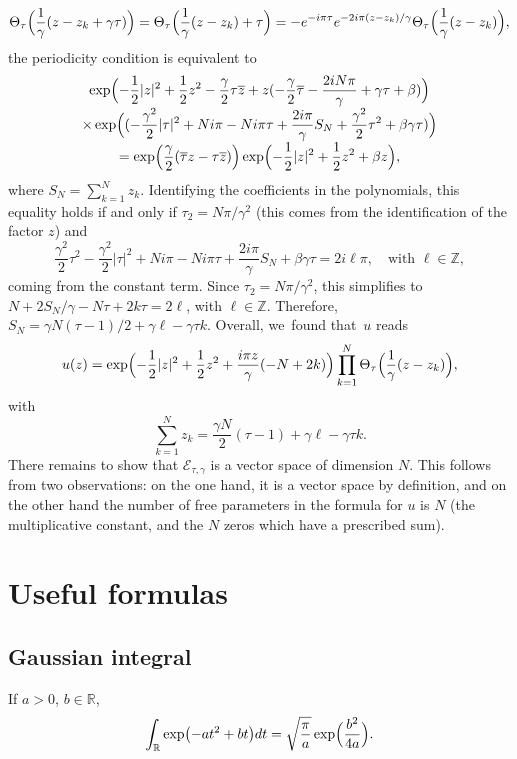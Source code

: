 \documentclass[JEP,XML,SOM,Unicode,NoFloatCountersInSection,published]{cedram}
\theoremstyle{definition}
\let\EE\exp
\let\ov\overline
\newcommand\R{\mathbb R}
\begin{document}
\[
\Theta_{\tau}\Bigl(\frac{1}{\gamma}(z-z_{k}+\gamma \tau)\Bigr) =\Theta_{\tau}\Bigl(\frac{1}{\gamma}(z-z_{k})+ \tau\Bigr) =- e^{-i \pi \tau}e^{- {2i\pi} (z-z_k)/ {\gamma}}\Theta_{\tau}\Bigl(\frac{1}{\gamma}(z-z_{k})\Bigr),
\]
the periodicity condition is equivalent to\vspace*{-5pt}
\begin{multline*}
\EE\Bigl(-\frac{1}{2}|z|^2 + \frac{1}{2}z^2 -\frac{\gamma}{2} \tau \ov{z} + z(-\frac{\gamma}{2} \ov{\tau} - \frac{2iN\pi}{\gamma} + \gamma\tau + \beta) \Bigr)\\[-3pt]
\times \EE\Bigl((-\frac{\gamma^2}{2} |\tau|^2 + Ni\pi - Ni\pi \tau + \frac{2i\pi}{\gamma} S_N + \frac{\gamma^2}{2} \tau^2 + \beta \gamma \tau)\Bigr)\\[-3pt]
= \EE\Bigl(\frac{\gamma}{2}(\ov{\tau} z - \tau \ov{z})\Bigr) \EE\Bigl(-\frac{1}{2} |z|^2 + \frac{1}{2} z^2 + \beta z\Bigr),
\end{multline*}
where $S_N=\sum_{k=1}^Nz_k$. Identifying the coefficients in the polynomials, this equality holds if and only if $\tau_2 = {N\pi}/{\gamma^2}$ (this comes from the identification of the factor $z$) and
\[
\frac{\gamma^2}{2} \tau^2 - \frac{\gamma^2}{2} |\tau|^2 + Ni\pi - Ni\pi\tau + \frac{2i\pi}{\gamma} S_N + \beta \gamma\tau = 2i \ell \pi, \quad \text{with $\ell \in \mathbb{Z}$},
\]
coming from the constant term. Since $\tau_2 = {N\pi}/{\gamma^2}$, this simplifies to $N + {2}S_N/{\gamma} - N\tau + 2k\tau = 2\ell$, with $\ell \in \mathbb{Z}$. Therefore, $S_N = {\gamma N}(\tau-1)/2+\gamma \ell-\gamma \tau k$. Overall, we~found that~$u$ reads
\[
u(z) = \EE\Bigl({-\frac{1}{2}|z|^2 + \frac{1}{2} z^2 + \frac{i\pi z}{\gamma}(-N + 2k)}\Bigr) \prod_{k=1}^N \Theta_{\tau}\Bigl(\frac{1}{\gamma}(z-z_{k})\Bigr),
\]
with
\[
\sum_{k=1}^N z_k = \frac{\gamma N}{2}(\tau-1)+\gamma \ell-\gamma \tau k. 
\]
There remains to show that $\mathcal{E}_{\tau,\gamma}$ is a vector space of dimension $N$. This follows from two observations: on the one hand, it is a vector space by definition, and on the other hand the number of free parameters in the formula for $u$ is $N$ (the multiplicative constant, and the $N$ zeros which have a prescribed sum).

\section{Useful formulas}

\subsection{Gaussian integral} If $a>0$, $b \in \mathbb{R}$,
\begin{equation}
\label{GaussianIntegral}
\int_{\R} \EE\bigl({-at^2+bt}\bigr) dt = \sqrt{\frac{\pi}{a}} \EE\Bigl(\frac{b^2}{4a}\Bigr).
\end{equation}
\end{document}

